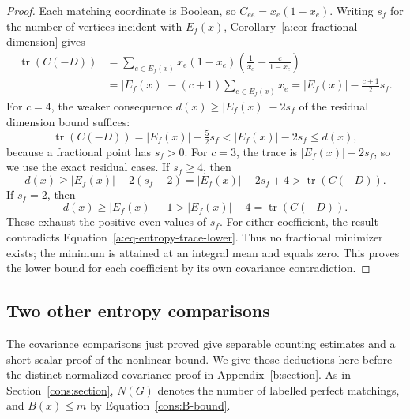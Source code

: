 \begin{proof}
Each matching coordinate is Boolean, so
\(C_{ee}=x_e(1-x_e)\).
Writing \(s_f\) for the number of vertices incident with
\(E_f(x)\), Corollary~\ref{a:cor-fractional-dimension} gives
\begin{equation}\label{a:eq-covariance-trace-c}
\begin{aligned}
 \operatorname{tr}(C(-D))
 &=\sum_{e\in E_f(x)}x_e(1-x_e)
       \left(\frac1{x_e}-\frac c{1-x_e}\right)\\
 &=|E_f(x)|-(c+1)\sum_{e\in E_f(x)}x_e
   =|E_f(x)|-\frac{c+1}{2}s_f.
\end{aligned}
\end{equation}
For \(c=4\), the weaker consequence
\(d(x)\ge|E_f(x)|-2s_f\) of the residual dimension bound suffices:
\[
 \operatorname{tr}(C(-D))=|E_f(x)|-\tfrac52s_f
 <|E_f(x)|-2s_f\le d(x),
\]
because a fractional point has \(s_f>0\).
For \(c=3\), the trace is \(|E_f(x)|-2s_f\), so we use the exact
residual cases. If \(s_f\ge4\), then
\[
 d(x)\ge|E_f(x)|-2(s_f-2)
       =|E_f(x)|-2s_f+4
       >\operatorname{tr}(C(-D)).
\]
If \(s_f=2\), then
\[
 d(x)\ge|E_f(x)|-1>|E_f(x)|-4
       =\operatorname{tr}(C(-D)).
\]
These exhaust the positive even values of \(s_f\). For either
coefficient, the result contradicts
Equation~\eqref{a:eq-entropy-trace-lower}. Thus no fractional minimizer
exists; the minimum is attained at an integral mean and equals zero.
This proves the lower bound for each coefficient by its own covariance
contradiction.
\end{proof}

\subsection{Two other entropy comparisons}

The covariance comparisons just proved give separable counting estimates
and a short scalar proof of the nonlinear bound. We give those deductions
here before the distinct normalized-covariance proof in
Appendix~\ref{b:section}. As in Section~\ref{cons:section},
$N(G)$ denotes the number of labelled perfect matchings, and
$B(x)\le m$ by Equation~\eqref{cons:B-bound}.

